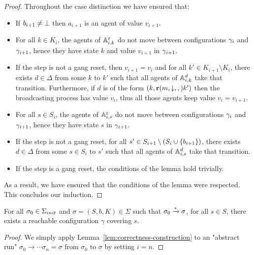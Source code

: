 \begin{proof}
Throughout the case distinction we have ensured that:
\begin{itemize}
	\item If $b_{i+1} \neq \bot$ then $a_{i+1}$ is an agent of value $v_{i+1}$.
	
	\item For all $k \in K_{i}$, the agents of $\mathbb{A}_{i,k}^\varepsilon$ do not move between configurations $\gamma_{i}$ and $\gamma_{i+1}$, hence they have state $k$ and value $v_{i+1}$ in $\gamma_{i+1}$.
	
	\item If the step is not a gang reset, then $v_{i+1} = v_i$ and for all $k' \in K_{i+1} \setminus K_i$, there exists $d \in \Delta$ from some $k$ to $k'$ such that all agents of $\mathbb{A}_{i,k}^d$ take that transition. Furthermore, if $d$ is of the form $(k,\textbf{r}(m, \downarrow, ,)k')$ then the broadcasting process has value $v_i$, thus all those agents keep value $v_i = v_{i+1}$. 
	
	\item For all $s \in S_{i}$, the agents of $\mathbb{A}_{i,s}^\varepsilon$ do not move between configurations $\gamma_{i}$ and $\gamma_{i+1}$, hence they have state $s$ in $\gamma_{i+1}$.
	
	\item If the step is not a gang reset, for all $s' \in S_{i+1} \setminus (S_i \cup \{b_{i+1}\})$, there exists $d \in \Delta$ from some $s \in S_i$ to $s'$ such that all agents of $\mathbb{A}_{i,s}^d$ take that transition.
	
	\item If the step is a gang reset, the conditions of the lemma hold trivially.
\end{itemize}

As a result, we have ensured that the conditions of the lemma were respected.
This concludes our induction.
\end{proof}
\fi

\begin{corollary}
	\label{cor:soundness}
	For all $\sigma_0 \in \aconfiginitset$ and $\sigma = (S, b, K) \in \Sigma$ such that $\sigma_0 \xrightarrow{*} \sigma$, for all $s \in S$, there exists a reachable configuration $\gamma$ covering $s$.
\end{corollary}

\ifproofs
\begin{proof}
	We simply apply Lemma~\ref{lem:correctness-construction} to an "abstract run" $\sigma_0 \to \cdots \sigma_n = \sigma$ from $\sigma_0$ to $\sigma$ by setting $i = n$.
\end{proof}
\fi
